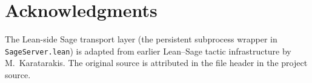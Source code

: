 \documentclass[11pt]{article}
\theoremstyle{plain}
\newtheorem{theorem}{Theorem}[section]
\theoremstyle{definition}
\newtheorem{definition}[theorem]{Definition}
\theoremstyle{remark}
\newcommand{\lean}[1]{\lstinline[language=lean]|#1|}
\begin{document}
\section*{Acknowledgments}
The Lean-side Sage transport layer (the persistent subprocess wrapper in \texttt{SageServer.lean}) is adapted from earlier Lean--Sage tactic infrastructure by M.~Karatarakis. The original source is attributed in the file header in the project source.









 
\end{document}
